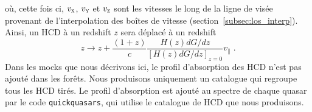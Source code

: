 où, cette fois ci, $v_{\textsc{x}}$, $v_{\textsc{y}}$ et $v_{\textsc{z}}$ sont les vitesses le long de la ligne de visée provenant de l'interpolation des boîtes de vitesse (section~\ref{subsec:los_interp}).
Ainsi, un HCD à un redshift $z$ sera déplacé à un redshift
\begin{equation}
  z \rightarrow  z + \frac{(1+z)}{c} \frac{H(z) dG/dz}{[H(z) dG/dz]_{z=0}} v_{\parallel} \; .
\end{equation}
Dans les mocks que nous décrivons ici, le profil d'absorption des HCD n'est pas ajouté dans les forêts. Nous produisons uniquement un catalogue qui regroupe tous les HCD tirés. Le profil d'absorption est ajouté au spectre de chaque quasar par le code \texttt{quickquasars}, qui utilise le catalogue de HCD que nous produisons.


